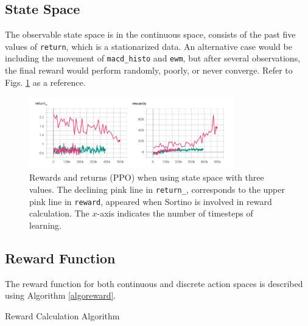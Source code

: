 \subsection{State Space}
The observable state space is in the continuous space, consists of the past five values of {\texttt{return}}, which is a stationarized data. An alternative case would be including the movement of \texttt{macd\_histo} and \texttt{ewm}, but after several observations, the final reward would perform randomly, poorly, or never converge. Refer to Figs. \ref{fig-three-bad} as a reference.

\begin{figure}[h]
    \centering
    \includegraphics[width=0.79\textwidth]{graphics/fig-three-bad.png}
    \caption{Rewards and returns (PPO) when using state space with three values. The declining pink line in \texttt{return\_}, corresponds to the upper pink line in \texttt{reward}, appeared when Sortino is involved in reward calculation. The $x$-axis indicates the number of timesteps of learning.}
    \label{fig-three-bad}
\end{figure}

\subsection{Reward Function}
	\label{rewardfn}
The reward function for both continuous and discrete action spaces is described using Algorithm \ref{algoreward}.

\begin{algorithm}[h]
\SetAlgoLined
{}


\caption{Reward Calculation Algorithm}
\label{algoreward}
\end{algorithm}

